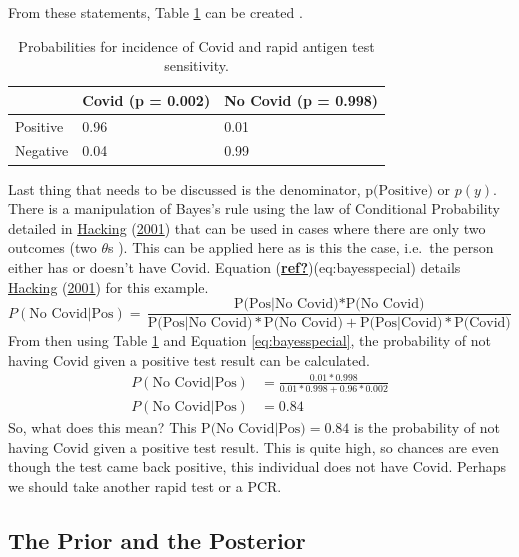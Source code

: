 \documentclass[12pt,twoside]{reedthesis}
\begin{document}
From these statements, Table \ref{tab:makingcovid} can be created .
\begin{table}[H]

\caption{\label{tab:makingcovid}\label{tab:makingcovid}Probabilities for incidence of Covid and rapid antigen test sensitivity.}
\centering
\begin{tabular}[t]{lll}
\toprule
  & Covid (p = 0.002) & No Covid (p = 0.998)\\
\midrule
Positive & 0.96 & 0.01\\
Negative & 0.04 & 0.99\\
\bottomrule
\end{tabular}
\end{table}
Last thing that needs to be discussed is the denominator, \(\text{p(Positive)}\) or \(p(y)\). There is a manipulation of Bayes's rule using the law of Conditional Probability detailed in \protect\hyperlink{ref-hackingIntroductionProbabilityInductive2001}{Hacking} (\protect\hyperlink{ref-hackingIntroductionProbabilityInductive2001}{2001}) that can be used in cases where there are only two outcomes (two \(\theta\)s ). This can be applied here as is this the case, i.e.~the person either has or doesn't have Covid. Equation (\protect\hyperlink{ref-ref}{\textbf{ref?}})(eq:bayesspecial) details \protect\hyperlink{ref-hackingIntroductionProbabilityInductive2001}{Hacking} (\protect\hyperlink{ref-hackingIntroductionProbabilityInductive2001}{2001}) for this example.
\begin{equation}
P(\text{No Covid|Pos}) = \frac{\text{P(Pos|No Covid)} * \text{P(No Covid)}}{\text{P(Pos|No Covid)} * \text{P(No Covid)} + \text{P(Pos|Covid)} * \text{P(Covid)}}
\label{eq:bayesspecial}
\end{equation}
From then using Table \ref{tab:makingcovid} and Equation \eqref{eq:bayesspecial}, the probability of not having Covid given a positive test result can be calculated.
\begin{align}
P(\text{No Covid|Pos}) &= \frac{0.01 * 0.998}{0.01 * 0.998 + 0.96 * 0.002} \\
P(\text{No Covid|Pos}) &= 0.84
\label{eq:bayesmath2}
\end{align}
So, what does this mean? This \(\text{P(No Covid|Pos)} = 0.84\) is the probability of not having Covid given a positive test result. This is quite high, so chances are even though the test came back positive, this individual does not have Covid. Perhaps we should take another rapid test or a PCR.

\hypertarget{priorpost}{%
\subsection{The Prior and the Posterior}\label{priorpost}}
\end{document}
